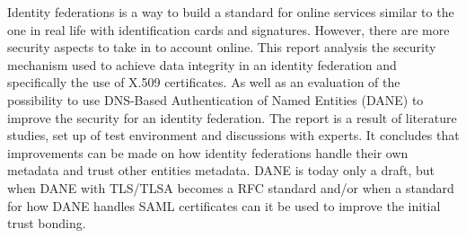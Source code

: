Identity federations is a way to build a standard for online services similar to the one in real life with identification cards and signatures.
However, there are more security aspects to take in to account online.
This report analysis the security mechanism used to achieve data integrity in an identity federation and specifically the use of X.509 certificates.
As well as an evaluation of the possibility to use DNS-Based Authentication of Named Entities (DANE) to improve the security for an identity federation.
The report is a result of literature studies, set up of test environment and discussions with experts.
It concludes that improvements can be made on how identity federations handle their own metadata and trust other entities metadata. 
DANE is today only a draft, but when DANE with TLS/TLSA becomes a RFC standard and/or when a standard for how DANE handles SAML certificates can it be used to improve the initial trust bonding.






